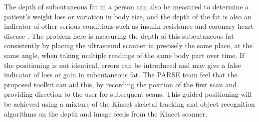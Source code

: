 The depth of subcutaneous fat in a person can also be measured to determine a patient's weight loss or variation in body size, and the depth of the fat is also an indicator of other serious conditions such as insulin resistance \cite{Goodpaster1997} and coronary heart disease \cite{Ducimetiere1986}. The problem here is measuring the depth of this subcutaneous fat consistently by placing the ultrasound scanner in precisely the same place, at the same angle, when taking multiple readings of the same body part over time. If the positioning is not identical, errors can be introduced and may give a false indicator of loss or gain in subcutaneous fat. The PARSE team feel that the proposed toolkit can aid this, by recording the position of the first scan and providing direction to the user for subsequent scans. This guided positioning will be achieved using a mixture of the Kinect skeletal tracking and object recognition algorithms on the depth and image feeds from the Kinect scanner.\\